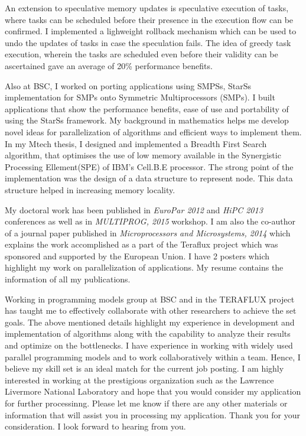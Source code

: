 \documentclass[10pt,stdletter,dateno]{newlfm}
\begin{document}
\begin{newlfm}
	   An extension to speculative memory updates is speculative execution of tasks, where tasks can be scheduled before their presence in the execution flow can be confirmed.
	   I implemented a lighweight rollback mechanism which can be used to undo the updates of tasks in case the speculation fails.
	   The idea of greedy task execution, wherein the tasks are scheduled even before their validity can be ascertained gave an average of 20\% performance benefits. 
%
	   \par
	   Also at BSC, I worked on porting applications using SMPSs, StarSs implementation for SMPs onto Symmetric Multiprocessors (SMPs).
	   I built applications that show the performance benefits, ease of use and portability of using the StarSs framework. 
	   My background in mathematics helps me develop novel ideas for parallelization of algorithms and efficient ways to implement them. 
	   In my Mtech thesis, I designed and implemented a Breadth First Search algorithm, that optimises the use of low memory available in the Synergistic Processing Ellement(SPE) of IBM's Cell.B.E processor. 
	   The strong point of the implementation was the design of a data structure to represent node. This data structure helped in increasing memory locality. 
%
	   \par
	   My doctoral work has been published in \textit{EuroPar 2012} and \textit{HiPC 2013} conferences as well as in \textit{MULTIPROG, 2015} workshop.  
	   I am also the co-author of a journal paper published in \textit{Microprocessors and Microsystems, 2014} which explains the work accomplished as a part of the Teraflux project which was sponsored and supported by the European Union. 
	   I have 2 posters which highlight my work on parallelization of applications. 
	   My resume contains the information of all my publications. 
%
	   \par
	   Working in programming models group at BSC and in the TERAFLUX project has taught me to effectively collaborate with other researchers to achieve the set goals.
	   The above mentioned details highlight my experience in development and implementation of algorithms along with the capability to analyze their results and optimize on the bottlenecks.
	   I have experience in working with widely used parallel programming models and to work collaboratively within a team.
	   Hence, I believe my skill set is an ideal match for the current job posting. 
	   I am highly interested in working at the prestigious organization such as the Lawrence Livermore National Laboratory and hope that you would consider my application for further processinng. 
	   Please let me know if there are any other materials or information that will assist you in processing my application.
	   Thank you for your consideration. I look forward to hearing from you.
%
\end{newlfm}
\end{document}
